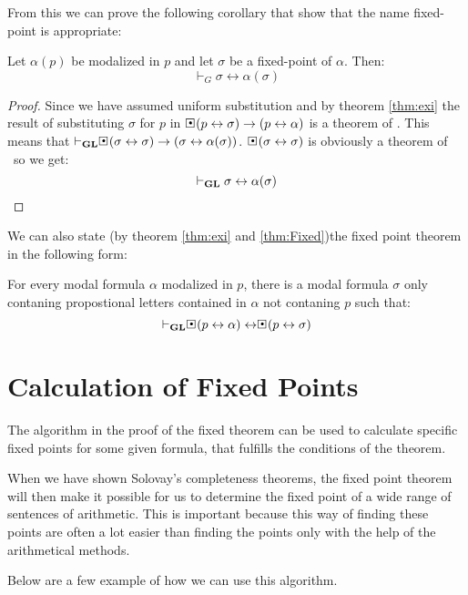 \documentclass[../main.tex]{subfiles}
\begin{document}
From this we can prove the following corollary that show that the name
fixed-point is appropriate:
\begin{cor}
	Let $\alpha(p)$ be modalized in $p$ and let $\sigma$ be a fixed-point
	of $\alpha$. Then:
	\[\vdash_G\sigma\leftrightarrow\alpha(\sigma)\]
\end{cor}
\begin{proof}
	Since we have assumed uniform substitution and by theorem \ref{thm:exi}
	the result of substituting $\sigma$ for $p$ in
	$\sBox(p\leftrightarrow\sigma)\rightarrow(p\leftrightarrow\alpha)$ is a
	theorem of \GL. This means that
	$\vdash_\GL\sBox(\sigma\leftrightarrow\sigma)\rightarrow(\sigma\leftrightarrow\alpha(\sigma))$.
	$\sBox(\sigma\leftrightarrow\sigma)$ is obviously a theorem of \GL\ so
	we get:
	\[\vdash_{\text{\textbf{GL}}}\sigma\leftrightarrow\alpha(\sigma)\]
\end{proof}
We can also state  (by theorem \ref{thm:exi} and \ref{thm:Fixed})the fixed
point theorem in the following form:

\begin{cor}
	\label{cor:Fixed}
	For every modal formula $\alpha$ modalized in $p$, there is a modal formula
	$\sigma$ only contaning propostional letters contained in $\alpha$ not
	contaning $p$ such that:
	\[\vdash_\GL\sBox(p\leftrightarrow\alpha)\leftrightarrow\sBox(p\leftrightarrow\sigma)\]
\end{cor}
\section{Calculation of Fixed Points}

The algorithm in the proof of the fixed theorem can be used to calculate
specific fixed points for some given formula, that fulfills the conditions of
the theorem. 

When we have shown Solovay's completeness theorems, the fixed point theorem
will then make it possible for us to determine the fixed point of a wide range
of sentences of arithmetic. This is important because this way of finding these
points are often a lot easier than finding the points only with the help of the
arithmetical methods.

Below are a few example of how we can use this algorithm.
\end{document}

